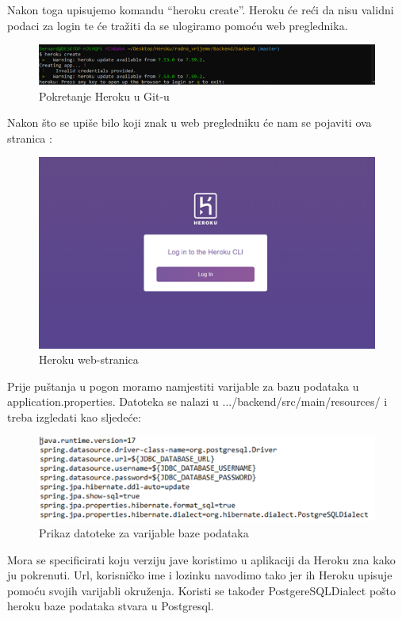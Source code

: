 				Nakon toga upisujemo komandu “heroku create”. Heroku će reći da nisu validni podaci za login te će tražiti da se ulogiramo pomoću web preglednika. 
				
				\begin{figure}[H] 					\centering 					                \includegraphics[width=\textwidth]{Dokumentacija/pogon/Picture2.png}
				\caption{Pokretanje Heroku u Git-u}
				\end{figure}
				Nakon što se upiše bilo koji znak u web pregledniku će nam se pojaviti ova stranica : 
				\begin{figure}[H] 					\centering 					                \includegraphics[width=\textwidth]{Dokumentacija/pogon/Picture3.png}
				\caption{Heroku web-stranica}
				\end{figure}
				Prije puštanja u pogon moramo namjestiti varijable za bazu podataka u application.properties. Datoteka se nalazi u .../backend/src/main/resources/ i treba izgledati kao sljedeće: 
				\begin{figure}[H] 					\centering 					                \includegraphics[width=\textwidth]{Dokumentacija/pogon/Picture4.png}
				\caption{Prikaz datoteke za varijable baze podataka}
				\end{figure}
				Mora se specificirati koju verziju jave koristimo u aplikaciji da Heroku zna kako ju pokrenuti. Url, korisničko ime i lozinku navodimo tako jer ih Heroku upisuje pomoću svojih varijabli okruženja. Koristi se također PostgereSQLDialect pošto heroku baze podataka stvara u Postgresql. 

